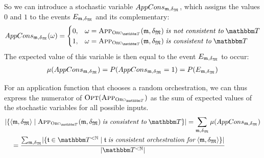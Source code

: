 So we can introduce a stochastic variable $AppCons_{\mathfrak{m},\mathfrak{\delta}_{\mathfrak{M}}}$, which assigns the values $0$ and $1$ to the events $E_{\mathfrak{m},\mathfrak{\delta}_{\mathfrak{M}}}$ and its complementary:
\begin{align*}
    AppCons_{\modeltuple{m},\changetuple{\metamodeltuple{M}}}(\omega) = \begin{cases}
        0, & \omega = \appfunction{\orcfunction{\transformationset{T}}}(\modeltuple{m}, \changetuple{\metamodeltuple{M}}) \mathtext{is not consistent to} \transformationset{T} \\
        1, & \omega = \appfunction{\orcfunction{\transformationset{T}}}(\modeltuple{m}, \changetuple{\metamodeltuple{M}}) \mathtext{is consistent to} \transformationset{T}
    \end{cases}
\end{align*}
The expected value of this variable is then equal to the event $E_{\mathfrak{m},\mathfrak{\delta}_{\mathfrak{M}}}$ to occur:
\begin{align*}
    \mu(AppCons_{\mathfrak{m},\mathfrak{\delta}_{\mathfrak{M}}}) = P(AppCons_{\mathfrak{m},\mathfrak{\delta}_{\mathfrak{M}}} = 1) = P(E_{\mathfrak{m},\mathfrak{\delta}_{\mathfrak{M}}})
\end{align*}

For an application function that chooses a random orchestration, we can thus express the numerator of $\function{Opt}(\appfunction{\orcfunction{\transformationset{T}}})$ as the sum of expected values of the stochastic variables for all possible inputs.
\begin{align*}
    &
    \abs{\setted{\tupled{\modeltuple{m},\changetuple{\metamodeltuple{M}}} \mid \appfunction{\orcfunction{\transformationset{T}}}(\modeltuple{m}, \changetuple{\metamodeltuple{M}}) \mathtext{is consistent to} \transformationset{T}}} = \sum_{\modeltuple{m},\changetuple{\metamodeltuple{M}}} \mu(AppCons_{\modeltuple{m},\changetuple{\metamodeltuple{M}}}) \\
    & \formulaskip
    = \frac{
        \sum_{\modeltuple{m},\changetuple{\metamodeltuple{M}}} \abs{\setted{\tuple{\transformation{t}} \in \transformationset{T}^{< \mathbb{N}} \mid \tuple{\transformation{t}} \mathtext{is consistent orchestration for} \tupled{\modeltuple{m}, \changetuple{\metamodeltuple{M}}}}}
    }{
        \abs{\transformationset{T}^{< \mathbb{N}}}
    }
\end{align*}

